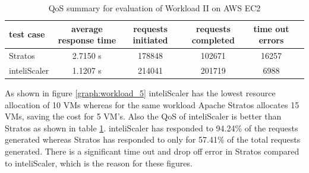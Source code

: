 \begin{table}[h!]
\centering
\caption{QoS summary for evaluation of Workload II on AWS EC2}
\label{table:analysis_qos_workload_5}
\begin{tabular}{|l|c|c|c|c|c|}
\hline

test case & average  response time & requests initiated & requests completed & time out errors \\ \hline

Stratos & 2.7150 s & 178848 & 102671 & 16257\\ \hline

inteliScaler & 1.1207 s & 214041 & 201719 & 6988\\ \hline

\end{tabular}
\end{table}

As shown in figure \ref{graph:workload_5} inteliScaler has the lowest resource allocation of 10 VMs whereas for the same workload Apache Stratos allocates 15 VMs, saving the cost for 5 VM's. Also the QoS of inteliScaler is better than Stratos as shown in table \ref{table:analysis_qos_workload_5}. inteliScaler has responded to 94.24\% of the requests generated whereas Stratos has responded to only for 57.41\% of the total requests generated. There is a significant time out and drop off error in Stratos compared to inteliScaler, which is the reason for these figures. 
